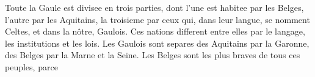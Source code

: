   Toute la Gaule est divis\’ee en trois parties, dont
l’une est habit\’ee par les Belges, l’autre par les Aquitains, la
troisi\‘eme par ceux qui, dans leur langue, se nomment Celtes, et dans
la n\^otre, Gaulois.  Ces nations diff\‘erent entre elles par
le langage, les institutions et les lois. Les Gaulois sont s\’epar\’es
des Aquitains par la Garonne, des Belges par la Marne et la Seine.
 Les Belges sont les plus braves de tous ces peuples, parce
